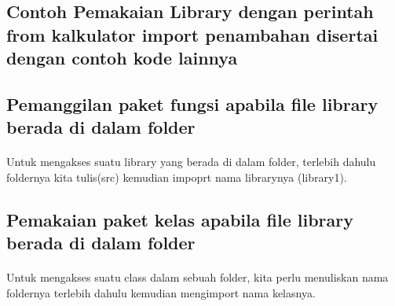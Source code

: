 \subsection{Contoh Pemakaian Library dengan perintah from kalkulator import penambahan disertai dengan contoh kode lainnya}



\subsection{Pemanggilan paket fungsi apabila file library berada di dalam folder}
\paragraph{}
    Untuk mengakses suatu library yang berada di dalam folder, terlebih dahulu foldernya kita tulis(src) kemudian impoprt nama librarynya (library1).

\subsection{Pemakaian paket kelas apabila file library berada di dalam folder}
\paragraph{}
    Untuk mengakses suatu class dalam sebuah folder, kita perlu menuliskan nama foldernya terlebih dahulu kemudian mengimport nama kelasnya.

\newpage

